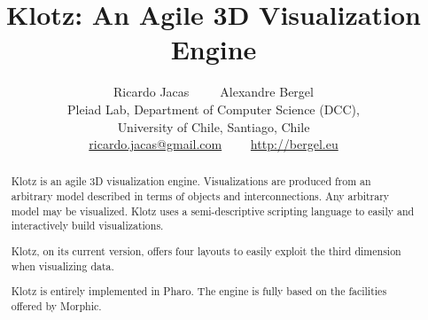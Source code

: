 \documentclass{sig-alternate}
\newcommand{\Title}{Klotz: An Agile 3D Visualization Engine}
\newcommand{\Authors}{Ricardo Jacas~~~~~Alexandre Bergel}
\newcommand{\AuthorsShort}{R. Jacas, A. Bergel}
\begin{document}


\title{\Title}

\author{\Authors\\
Pleiad Lab, Department of Computer Science (DCC),\\ University of Chile, Santiago, Chile\\ [1 ex]
\url{ricardo.jacas@gmail.com}~~~~
\url{http://bergel.eu}
}




\newcommand{\spp}{~~~~~~~}

\maketitle


\begin{abstract}
Klotz is an agile 3D visualization engine. Visualizations are produced from an arbitrary model described in terms of objects and interconnections. Any arbitrary model may be visualized.
Klotz uses a semi-descriptive scripting language to easily and interactively build visualizations. 

Klotz, on its current version, offers four layouts to easily exploit the third dimension when visualizing data. %

Klotz is entirely implemented in Pharo. The engine is fully based on the facilities offered by Morphic. 
\end{abstract}
\end{document}
